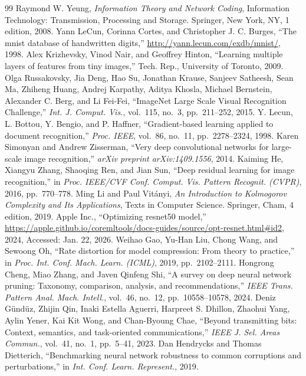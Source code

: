\begin{thebibliography}{99}
 Raymond W. Yeung, \emph{Information Theory and Network Coding}, Information Technology: Transmission, Processing and Storage. Springer, New York, NY, 1 edition, 2008.
 Yann LeCun, Corinna Cortes, and Christopher J. C. Burges, ``The mnist database of handwritten digits,'' \url{http://yann.lecun.com/exdb/mnist/}, 1998.
 Alex Krizhevsky, Vinod Nair, and Geoffrey Hinton, ``Learning multiple layers of features from tiny images,'' Tech. Rep., University of Toronto, 2009.
 Olga Russakovsky, Jia Deng, Hao Su, Jonathan Krause, Sanjeev Satheesh, Sean Ma, Zhiheng Huang, Andrej Karpathy, Aditya Khosla, Michael Bernstein, Alexander C. Berg, and Li Fei-Fei, ``ImageNet Large Scale Visual Recognition Challenge,'' \emph{Int. J. Comput. Vis.}, vol.~115, no.~3, pp.~211--252, 2015.
 Y. Lecun, L. Bottou, Y. Bengio, and P. Haffner, ``Gradient-based learning applied to document recognition,'' \emph{Proc. IEEE}, vol.~86, no.~11, pp.~2278--2324, 1998.
 Karen Simonyan and Andrew Zisserman, ``Very deep convolutional networks for large-scale image recognition,'' \emph{arXiv preprint arXiv:1409.1556}, 2014.
 Kaiming He, Xiangyu Zhang, Shaoqing Ren, and Jian Sun, ``Deep residual learning for image recognition,'' in \emph{Proc. IEEE/CVF Conf. Comput. Vis. Pattern Recognit. (CVPR)}, 2016, pp.~770--778.
 Ming Li and Paul Vitányi, \emph{An Introduction to Kolmogorov Complexity and Its Applications}, Texts in Computer Science. Springer, Cham, 4 edition, 2019.
 Apple Inc., ``Optimizing resnet50 model,'' \url{https://apple.github.io/coremltools/docs-guides/source/opt-resnet.html\#id2}, 2024, Accessed: Jan. 22, 2026.
 Weihao Gao, Yu-Han Liu, Chong Wang, and Sewoong Oh, ``Rate distortion for model compression: From theory to practice,'' in \emph{Proc. Int. Conf. Mach. Learn. (ICML)}, 2019, pp.~2102--2111.
 Hongrong Cheng, Miao Zhang, and Javen Qinfeng Shi, ``A survey on deep neural network pruning: Taxonomy, comparison, analysis, and recommendations,'' \emph{IEEE Trans. Pattern Anal. Mach. Intell.}, vol.~46, no.~12, pp.~10558--10578, 2024.
 Deniz Gündüz, Zhijin Qin, Inaki Estella Aguerri, Harpreet S. Dhillon, Zhaohui Yang, Aylin Yener, Kai Kit Wong, and Chan-Byoung Chae, ``Beyond transmitting bits: Context, semantics, and task-oriented communications,'' \emph{IEEE J. Sel. Areas Commun.}, vol.~41, no.~1, pp.~5--41, 2023.
 Dan Hendrycks and Thomas Dietterich, ``Benchmarking neural network robustness to common corruptions and perturbations,'' in \emph{Int. Conf. Learn. Represent.}, 2019.
\end{thebibliography}
